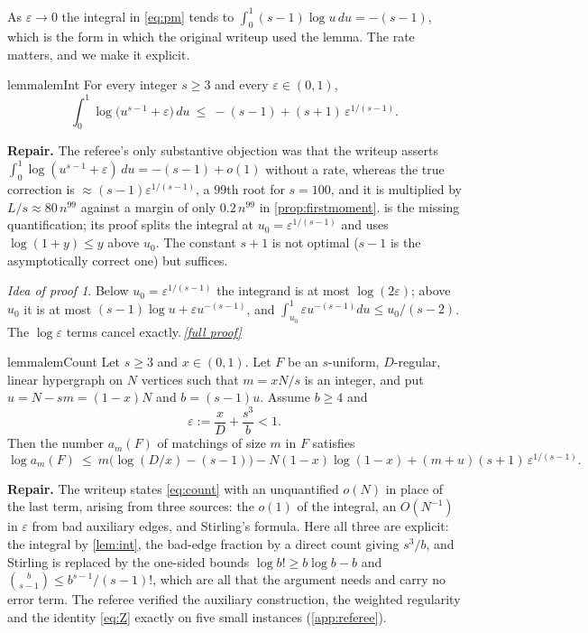 \documentclass[11pt,a4paper]{article}
\theoremstyle{plain}
\theoremstyle{definition}
\theoremstyle{remark}
\newtheorem*{proofidea}{Idea of proof}
\newcommand{\fullproofref}[1]{\,\hyperref[#1]{\textit{[full proof]}}}
\newcommand{\repair}[1]{\begin{tcolorbox}[colback=blue!4,colframe=blue!40!black,boxrule=0.4pt,arc=2pt,left=4pt,right=4pt,top=2pt,bottom=2pt]\small\textbf{Repair.} #1\end{tcolorbox}}
\begin{document}
As $\varepsilon\to0$ the integral in \eqref{eq:pm} tends to $\int_0^1(s-1)\log u\,du=-(s-1)$, which is the form in which the original writeup used the lemma. The rate matters, and we make it explicit.

\begin{restatable}{lemma}{lemInt}\label{lem:int}
For every integer $s\ge3$ and every $\varepsilon\in(0,1)$,
\[
\int_0^1\log\bigl(u^{s-1}+\varepsilon\bigr)\,du\ \le\ -(s-1)+(s+1)\,\varepsilon^{1/(s-1)} .
\]
\end{restatable}

\repair{The referee's only substantive objection was that the writeup asserts $\int_0^1\log(u^{s-1}+\varepsilon)\,du=-(s-1)+o(1)$ without a rate, whereas the true correction is $\approx(s-1)\varepsilon^{1/(s-1)}$, a $99$th root for $s=100$, and it is multiplied by $L/s\approx80\,n^{99}$ against a margin of only $0.2\,n^{99}$ in \cref{prop:firstmoment}. \Cref{lem:int} is the missing quantification; its proof splits the integral at $u_0=\varepsilon^{1/(s-1)}$ and uses $\log(1+y)\le y$ above $u_0$. The constant $s+1$ is not optimal ($s-1$ is the asymptotically correct one) but suffices.}

\begin{proofidea}
Below $u_0=\varepsilon^{1/(s-1)}$ the integrand is at most $\log(2\varepsilon)$; above $u_0$ it is at most $(s-1)\log u+\varepsilon u^{-(s-1)}$, and $\int_{u_0}^1\varepsilon u^{-(s-1)}du\le u_0/(s-2)$. The $\log\varepsilon$ terms cancel exactly.\fullproofref{pf:int}
\end{proofidea}

\begin{restatable}{lemma}{lemCount}\label{lem:count}
Let $s\ge3$ and $x\in(0,1)$. Let $F$ be an $s$-uniform, $D$-regular, linear hypergraph on $N$ vertices such that $m=xN/s$ is an integer, and put $u=N-sm=(1-x)N$ and $b=(s-1)u$. Assume $b\ge4$ and
\[
\varepsilon:=\frac xD+\frac{s^3}{b}<1 .
\]
Then the number $a_m(F)$ of matchings of size $m$ in $F$ satisfies
\begin{equation}\label{eq:count}
\log a_m(F)\ \le\ m\bigl(\log(D/x)-(s-1)\bigr)-N(1-x)\log(1-x)+(m+u)(s+1)\,\varepsilon^{1/(s-1)} .
\end{equation}
\end{restatable}

\repair{The writeup states \eqref{eq:count} with an unquantified $o(N)$ in place of the last term, arising from three sources: the $o(1)$ of the integral, an $O(N^{-1})$ in $\varepsilon$ from bad auxiliary edges, and Stirling's formula. Here all three are explicit: the integral by \cref{lem:int}, the bad-edge fraction by a direct count giving $s^3/b$, and Stirling is replaced by the one-sided bounds $\log b!\ge b\log b-b$ and $\binom{b}{s-1}\le b^{s-1}/(s-1)!$, which are all that the argument needs and carry no error term. The referee verified the auxiliary construction, the weighted regularity and the identity \eqref{eq:Z} exactly on five small instances (\cref{app:referee}).}
\end{document}
